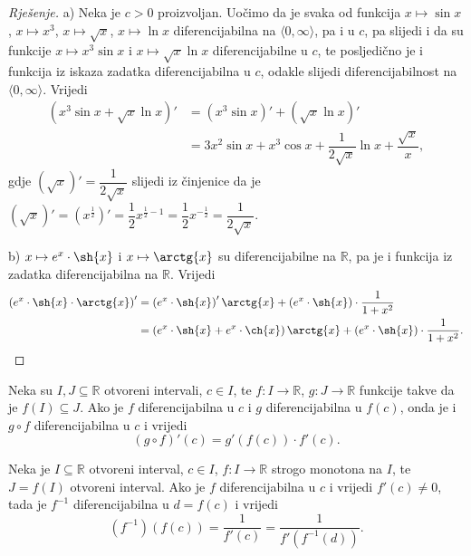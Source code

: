 \begin{proof}[Rješenje]
a) Neka je \(c>0\) proizvoljan. Uočimo da je svaka od funkcija \(x\mapsto \sin{x}\), \(x\mapsto x^3\), \(x\mapsto \sqrt{x}\), \(x\mapsto \ln{x}\) diferencijabilna na \(\langle 0,\infty\rangle\), pa i u \(c\), pa slijedi i da su funkcije \(x\mapsto x^3\sin{x}\) i \(x\mapsto \sqrt{x}\ln{x}\) diferencijabilne u \(c\), te posljedično je i funkcija iz iskaza zadatka diferencijabilna u \(c\), odakle slijedi diferencijabilnost na \(\langle 0,\infty\rangle\). Vrijedi
\begin{align*}
\left(x^3\sin{x}+\sqrt{x}\ln{x}\right)'&=\left(x^3\sin{x}\right)'+\left(\sqrt{x}\ln{x}\right)'\\
&=3x^2\sin{x}+x^3\cos{x}+\dfrac{1}{2\sqrt{x}}\ln{x}+\dfrac{\sqrt{x}}{x},
\end{align*}
gdje \(\left(\sqrt{x}\right)'=\dfrac{1}{2\sqrt{x}}\) slijedi iz činjenice da je \(\left(\sqrt{x}\right)'=\left(x^\frac{1}{2}\right)'=\dfrac{1}{2}x^{\frac{1}{2}-1}=\dfrac{1}{2}x^{-\frac{1}{2}}=\dfrac{1}{2\sqrt{x}}\).

b) \(x\mapsto e^x\cdot \sh{x}\) i \(x\mapsto \arctg{x}\) su diferencijabilne na \(\mathbb{R}\), pa je i funkcija iz zadatka diferencijabilna na \(\mathbb{R}\). Vrijedi
\begin{align*}
\left(e^x\cdot\sh{x}\cdot\arctg{x}\right)'&=\left(e^x\cdot\sh{x}\right)'\arctg{x}+\left(e^x\cdot\sh{x}\right)\cdot \dfrac{1}{1+x^2}\\
&=\left(e^x\cdot \sh{x}+e^x\cdot \ch{x}\right)\arctg{x}+\left(e^x\cdot\sh{x}\right)\cdot \dfrac{1}{1+x^2}.\qedhere
\end{align*}
\end{proof}
\begin{remark}
Neka su \(I, J\subseteq \mathbb{R}\) otvoreni intervali, \(c\in I\), te \(f : I\to \mathbb{R}\), \(g : J\to \mathbb{R}\) funkcije takve da je \(f(I)\subseteq J\). Ako je \(f\) diferencijabilna u \(c\) i \(g\) diferencijabilna u \(f(c)\), onda je i \(g\circ f\) diferencijabilna u \(c\) i vrijedi
\[\left(g\circ f\right)'(c)=g'\left(f(c)\right)\cdot f'(c).\]
\end{remark}
\begin{remark}
Neka je \(I\subseteq \mathbb{R}\) otvoreni interval, \(c\in I\), \(f : I\to \mathbb{R}\) strogo monotona na \(I\), te \(J=f(I)\) otvoreni interval. Ako je \(f\) diferencijabilna u \(c\) i vrijedi \(f'(c)\neq 0\), tada je \(f^{-1}\) diferencijabilna u \(d=f(c)\) i vrijedi
\[\left(f^{-1}\right)\left(f(c)\right)=\dfrac{1}{f'(c)}=\dfrac{1}{f'\left(f^{-1}(d)\right)}.\]
\end{remark}
